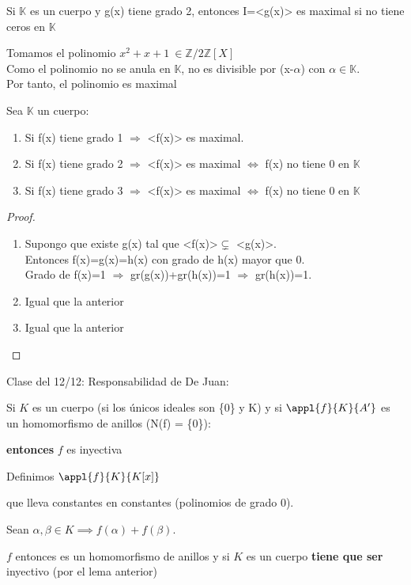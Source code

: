 \documentclass[nochap]{apuntes}
\begin{document}
\begin{lemma}
 Si $\mathbb{K}$  es un cuerpo y g(x) tiene grado 2, entonces I=<g(x)>  es maximal si no tiene ceros en $\mathbb{K}$
\end{lemma}
\begin{example}
 Tomamos el polinomio $x^2+x+1 \ \in \mathbb{Z}/2\mathbb{Z}[X]$\\
 Como el polinomio no se anula en $\mathbb{K}$, no es divisible por (x-$\alpha$) con $\alpha \in \mathbb{K}$.\\
 Por tanto, el polinomio es maximal
\end{example}

\begin{theorem}
 Sea $\mathbb{K}$  un cuerpo:
 \begin{enumerate}
  \item Si f(x) tiene grado 1 $\Rightarrow$  <f(x)> es maximal.
  \item Si f(x) tiene grado 2 $\Rightarrow$  <f(x)> es maximal $\Leftrightarrow$  f(x) no tiene 0 en $\mathbb{K}$
  \item Si f(x) tiene grado 3 $\Rightarrow$  <f(x)> es maximal $\Leftrightarrow$  f(x) no tiene 0 en $\mathbb{K}$
 \end{enumerate}
\end{theorem}
\begin{proof}
 \begin{enumerate}
  \item Supongo que existe g(x) tal que <f(x)>$\varsubsetneq$  <g(x)>. \\
  Entonces f(x)=g(x)=h(x) con grado de h(x) mayor que 0.\\
  Grado de f(x)=1 $\Rightarrow$  gr(g(x))+gr(h(x))=1 $\Rightarrow$  gr(h(x))=1.
  \item Igual que la anterior
  \item Igual que la anterior
 \end{enumerate}

\end{proof}

Clase del 12/12: Responsabilidad de De Juan:
\begin{lemma}
Si $K$ es un cuerpo (si los únicos ideales son \{0\} y K) y si $\appl{f}{K}{A'}$ es un homomorfismo de anillos (N(f) = \{0\}):

\textbf{entonces} $f$ es inyectiva
\end{lemma}

\begin{example}
Definimos $\appl{f}{K}{K[x]}$

que lleva constantes en constantes (polinomios de grado 0).

Sean $\alpha,\beta \in K \implies f(\alpha) + f(\beta)$.

$f$ entonces es un homomorfismo de anillos y si $K$ es un cuerpo \textbf{tiene que ser} inyectivo (por el lema anterior)
\end{example}
\end{document}
